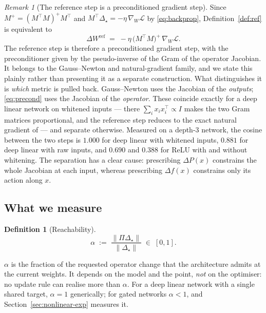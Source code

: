 \documentclass{article} %
\theoremstyle{plain}
\theoremstyle{definition}
\newtheorem{definition}[theorem]{Definition}
\theoremstyle{remark}
\newtheorem{remark}[theorem]{Remark}
\begin{document}
\begin{remark}[The reference step is a preconditioned gradient step]
\label{rem:precond}
Since $M^{+} = (M^\top M)^{+} M^\top$ and $M^\top \Delta_\star = -\eta\,\nabla_W \mathcal{L}$ by
\eqref{eq:backprop}, Definition~\ref{def:ref} is equivalent to
\begin{equation}
  \Delta W^{\mathrm{ref}} \;=\; -\eta\,\big(M^\top M\big)^{+}\,\nabla_W \mathcal{L} .
  \label{eq:precond}
\end{equation}
The reference step is therefore a preconditioned gradient step, with the preconditioner given by
the pseudo-inverse of the Gram of the operator Jacobian. It belongs to the Gauss--Newton and
natural-gradient family, and we state this plainly rather than presenting it as a separate
construction. What distinguishes it is \emph{which} metric is pulled back. Gauss--Newton uses the
Jacobian of the \emph{outputs}; \eqref{eq:precond} uses the Jacobian of the \emph{operator}. These
coincide exactly for a deep linear network on whitened inputs --- there
$\sum_i x_i x_i^\top \propto I$ makes the two Gram matrices proportional, and the reference step
reduces to the exact natural gradient of \citet{bernacchia2018exact} --- and separate otherwise.
Measured on a depth-3 network, the cosine between the two steps is $1.000$ for deep linear with
whitened inputs, $0.881$ for deep linear with raw inputs, and $0.690$ and $0.388$ for ReLU with and
without whitening. The separation has a clear cause: prescribing $\Delta P(x)$ constrains the whole
Jacobian at each input, whereas prescribing $\Delta f(x)$ constrains only its action along $x$.
\end{remark}

\subsection{What we measure}
\label{sec:diagnostics}

\begin{definition}[Reachability]
\begin{equation}
  \alpha \;:=\; \frac{\|\Pi \Delta_\star\|}{\|\Delta_\star\|} \;\in\; [0,1].
\end{equation}
\end{definition}
$\alpha$ is the fraction of the requested operator change that the architecture admits at the
current weights. It depends on the model and the point, \emph{not} on the optimiser: no update
rule can realise more than $\alpha$. For a deep linear network with a single shared target,
$\alpha = 1$ generically; for gated networks $\alpha < 1$, and Section~\ref{sec:nonlinear-exp}
measures it.
\end{document}

